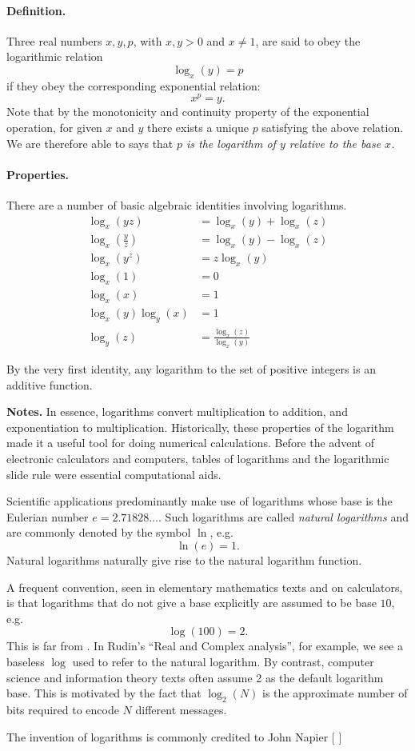 \documentclass[12pt]{article}
\begin{document}
\paragraph{Definition.}
Three real numbers $x, y, p$, with $x,y>0$ and $x \neq 1$, are said to obey the
logarithmic relation
$$\log_x(y)= p$$
if they obey the corresponding exponential relation:
$$x^p=y.$$
Note that by the monotonicity and continuity property of the
exponential operation, for given $x$ and $y$ there exists a unique $p$
satisfying the above relation.  We are therefore able to says that
{\em $p$ is the logarithm of $y$ relative to the base $x$.}

\paragraph{Properties.}
There are a number of basic algebraic identities involving logarithms.
\begin{align*}
\log_x(yz) &= \log_x(y) + \log_x(z)\\ 
\log_x \left( \frac{y}{z} \right) &= \log_x(y) - \log_x(z)\\
\log_x(y^z) &= z \log_x(y) \\
\log_x(1) &= 0 \\
\log_x(x) &= 1 \\
\log_x(y) \log_y(x) &= 1\\
\log_y(z) &= \frac{\log_x(z)}{\log_x(y)}
\end{align*}

By the very first identity, any logarithm  to the set of positive integers is an additive function.

{\bf Notes.} In essence, logarithms convert multiplication to
addition, and exponentiation to multiplication. Historically, these
properties of the logarithm made it a useful tool for doing numerical
calculations. Before the advent of electronic calculators and
computers, tables of logarithms and the logarithmic slide rule were
essential computational aids.

Scientific applications predominantly make use of
logarithms whose base is the Eulerian number $e = 2.71828\ldots$.
Such logarithms are called {\em natural logarithms} and are commonly
denoted by the symbol $\ln$, e.g.
$$\ln(e) = 1.$$
Natural logarithms naturally give rise to the natural logarithm function.

A frequent convention, seen in elementary mathematics texts and on
calculators, is that logarithms that do not give a base explicitly are
assumed to be base $10$, e.g.
$$\log(100) = 2.$$
This is far from .  In Rudin's ``Real and
Complex analysis'', for example, we see a baseless $\log$ used to
refer to the natural logarithm.  By contrast, computer science and
information theory texts often assume 2 as the default logarithm base.
This is motivated by the fact that $\log_2(N)$ is the approximate
number of bits required to encode $N$ different messages.


The invention of logarithms is commonly credited to John Napier [
]
\end{document}
